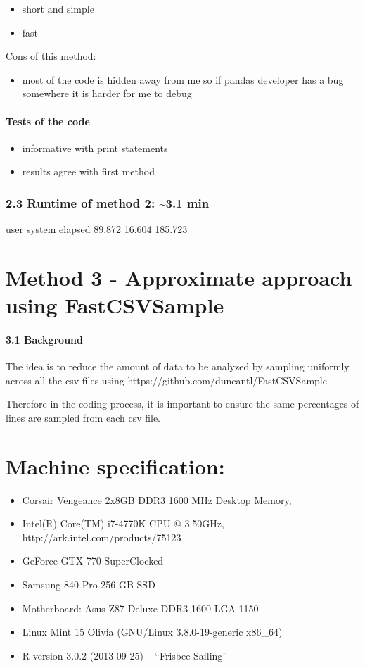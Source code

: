 \documentclass[letterpaper,10pt,english]{/usr/local/lib/python2.7/dist-packages/sphinx/texinputs/sphinxhowto}
\begin{document}
\begin{itemize}
\itemsep1pt\parskip0pt
\item
  short and simple
\item
  fast
\end{itemize}

Cons of this method:

\begin{itemize}
\itemsep1pt\parskip0pt
\item
  most of the code is hidden away from me so if pandas developer has a
  bug somewhere it is harder for me to debug
\end{itemize}\subsection{Tests of the code}\begin{itemize}
\itemsep1pt\parskip0pt
\item
  informative with print statements
\item
  results agree with first method
\end{itemize}\section{2.3 Runtime of method 2: \textasciitilde{}3.1 min}user system elapsed 89.872 16.604 185.723
\part{
  Method 3 - Approximate approach using FastCSVSample
}
\subsection{3.1 Background}The idea is to reduce the amount of data to be analyzed by sampling
uniformly across all the csv files using
https://github.com/duncantl/FastCSVSample

Therefore in the coding process, it is important to ensure the same
percentages of lines are sampled from each csv file.\part{
  Machine specification:
}\begin{itemize}
\itemsep1pt\parskip0pt
\item
  Corsair Vengeance 2x8GB DDR3 1600 MHz Desktop Memory,
\item
  Intel(R) Core(TM) i7-4770K CPU @ 3.50GHz,
  http://ark.intel.com/products/75123
\item
  GeForce GTX 770 SuperClocked
\item
  Samsung 840 Pro 256 GB SSD
\item
  Motherboard: Asus Z87-Deluxe DDR3 1600 LGA 1150
\item
  Linux Mint 15 Olivia (GNU/Linux 3.8.0-19-generic x86\_64)
\item
  R version 3.0.2 (2013-09-25) -- ``Frisbee Sailing''
\end{itemize}
\end{document}
